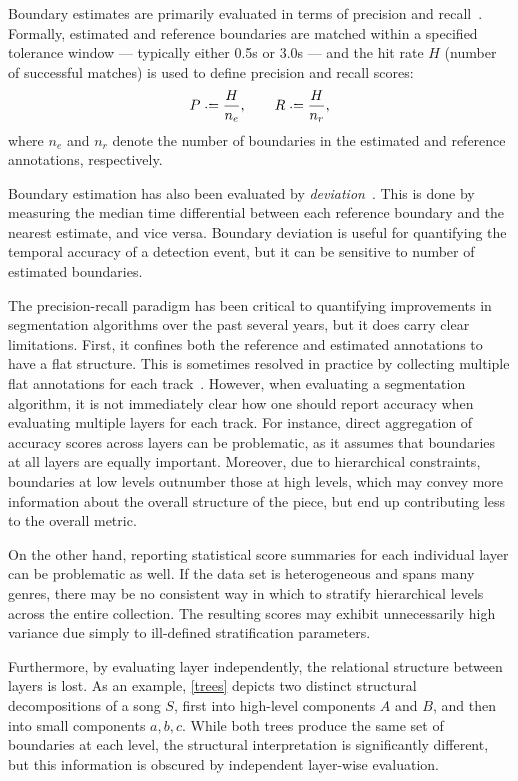 \documentclass{article}
\begin{document}
Boundary estimates are primarily evaluated in terms of precision and recall~\cite{turnbull2007supervised}.  Formally, estimated and
reference boundaries are matched within a specified tolerance window --- typically either 0.5s or 3.0s --- and the hit rate $H$ (number of successful matches) 
is used to define precision and recall scores:
\begin{equation}
P \defeq \frac{H}{n_e}, \quad\quad R \defeq \frac{H}{n_r},
\end{equation}
where $n_e$ and $n_r$ denote the number of boundaries in the estimated and reference
annotations, respectively.

Boundary estimation has also been evaluated by
\emph{deviation}~\cite{turnbull2007supervised}.  This is done by measuring the median
time differential between each reference boundary and the nearest estimate, and vice 
versa. Boundary deviation is useful for quantifying the temporal accuracy of a detection
event, but it can be sensitive to number of estimated boundaries.

The precision-recall paradigm has been critical to quantifying improvements in segmentation algorithms over the past several years,
but it does carry clear limitations.  First, it confines both the reference and estimated annotations to have a flat structure.  
This is sometimes resolved in practice by collecting multiple flat annotations for each track~\cite{Smith2011}.  
However, when evaluating a segmentation algorithm, it is not immediately clear how one should report accuracy when evaluating multiple 
layers for each track.  For instance, direct aggregation of accuracy scores across layers can be problematic,
as it assumes that boundaries at all layers are equally important.  Moreover, due to hierarchical constraints, boundaries at low
levels outnumber those at high levels, which may convey more information about the overall structure of the piece, but end up 
contributing less to the overall metric.

On the other hand, reporting statistical score summaries for each individual layer can be problematic as well.  If the data set is
heterogeneous and spans many genres, there may be no consistent way in which to stratify hierarchical levels across the entire
collection. The resulting scores may exhibit unnecessarily high variance due simply to ill-defined stratification parameters.

Furthermore, by evaluating layer independently, the relational structure between layers is lost.  As an example, \cref{trees}
depicts two distinct structural decompositions of a song $S$, first into high-level components $A$ and $B$, and then into small
components $a, b, c$.  While both trees produce the same set of boundaries at each level, the structural interpretation is
significantly different, but this information is obscured by independent layer-wise evaluation.
\end{document}
